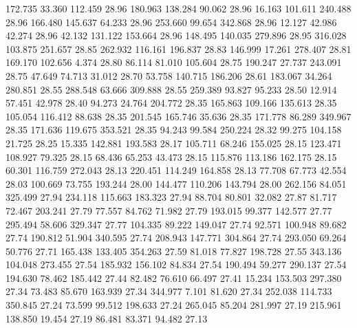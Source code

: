  172.735   33.360  112.459        28.96
 180.963  138.284   90.062        28.96
  16.163  101.611  240.488        28.96
 166.480  145.637   64.233        28.96
 253.660   99.654  342.868        28.96
  12.127   42.986   42.274        28.96
  42.132  131.122  153.664        28.96
 148.495  140.035  279.896        28.95
 316.028  103.875  251.657        28.85
 262.932  116.161  196.837        28.83
 146.999   17.261  278.407        28.81
 169.170  102.656    4.374        28.80
  86.114   81.010  105.604        28.75
 190.247   27.737  243.091        28.75
  47.649   74.713   31.012        28.70
  53.758  140.715  186.206        28.61
 183.067   34.264  280.851        28.55
 288.548   63.666  309.888        28.55
 259.389   93.827   95.233        28.50
  12.914   57.451   42.978        28.40
  94.273   24.764  204.772        28.35
 165.863  109.166  135.613        28.35
 105.054  116.412   88.638        28.35
 201.545  165.746   35.636        28.35
 171.778   86.289  349.967        28.35
 171.636  119.675  353.521        28.35
  94.243   99.584  250.224        28.32
  99.275  104.158   21.725        28.25
  15.335  142.881  193.583        28.17
 105.711   68.246  155.025        28.15
 123.471  108.927   79.325        28.15
  68.436   65.253   43.473        28.15
 115.876  113.186  162.175        28.15
  60.301  116.759  272.043        28.13
 220.451  114.249  164.858        28.13
  77.708   67.773   42.554        28.03
 100.669   73.755  193.244        28.00
 144.477  110.206  143.794        28.00
 262.156   84.051  325.499        27.94
 234.118  115.663  183.323        27.94
  88.704   80.801   32.082        27.87
  81.717   72.467  203.241        27.79
  77.557   84.762   71.982        27.79
 193.015   99.377  142.577        27.77
 295.494   58.606  329.347        27.77
 104.335   89.222  149.047        27.74
  92.571  100.948   89.682        27.74
 190.812   51.904  340.595        27.74
 208.943  147.771  304.864        27.74
 293.050   69.264   50.776        27.71
 165.438  133.405  354.263        27.59
  81.018   77.827  198.728        27.55
 343.136  104.048  273.455        27.54
 185.932  156.102   84.834        27.54
 190.494   59.277  290.137        27.54
 194.630   78.462  185.442        27.44
  82.482   76.610   66.497        27.41
  15.234  153.503  297.380        27.34
  73.483   85.670  163.939        27.34
 344.977    7.101   81.620        27.34
 252.038  114.733  350.845        27.24
  73.599   99.512  198.633        27.24
 265.045   85.204  281.997        27.19
 215.961  138.850   19.454        27.19
  86.481   83.371   94.482        27.13
